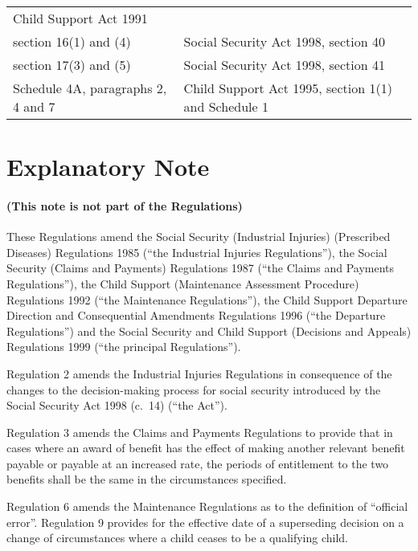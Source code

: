 \documentclass[12pt,a4paper]{article}
\begin{document}
{\begin{longtable}{p{181.94467pt}p{184.07935pt}}
\pagebreak[2]
Child Support Act 1991\\
\hspace{1em}section 16(1) and (4)	&Social Security Act 1998, section 40\\
\hspace{1em}section 17(3) and (5)	&Social Security Act 1998, section 41\\
\hspace{1em}Schedule 4A, paragraphs 2, 4 and 7	&Child Support Act 1995, section 1(1) and Schedule 1\\
\end{longtable}

}

\part{Explanatory Note}

\renewcommand\parthead{--- Explanatory Note}

\subsection*{(This note is not part of the Regulations)}

These Regulations amend the Social Security (Industrial Injuries) (Prescribed Diseases) Regulations 1985 (“the Industrial Injuries Regulations”), the Social Security (Claims and Payments) Regulations 1987 (“the Claims and Payments Regulations”), the Child Support (Maintenance Assessment Procedure) Regulations 1992 (“the Maintenance Regulations”), the Child Support Departure Direction and Consequential Amendments Regulations 1996 (“the Departure Regulations”) and the Social Security and Child Support (Decisions and Appeals) Regulations 1999 (“the principal Regulations”).

Regulation 2 amends the Industrial Injuries Regulations in consequence of the changes to the decision-making process for social security introduced by the Social Security Act 1998 (c.\ 14) (“the Act”).

Regulation 3 amends the Claims and Payments Regulations to provide that in cases where an award of benefit has the effect of making another relevant benefit payable or payable at an increased rate, the periods of entitlement to the two benefits shall be the same in the circumstances specified.

Regulation 6 amends the Maintenance Regulations as to the definition of “official error”. Regulation 9 provides for the effective date of a superseding decision on a change of circumstances where a child ceases to be a qualifying child.
\end{document}
